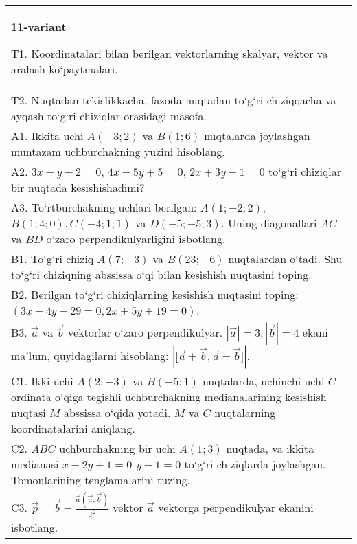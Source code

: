 \documentclass{article}
\begin{document}
\begin{tabular}{m{17cm}}
\textbf{11-variant}
\newline

T1. 
Koordinatalari bilan berilgan vektorlarning skalyar, vektor va aralash ko‘paytmalari. \\
T2. 
Nuqtadan tekislikkacha, fazoda nuqtadan to‘g‘ri chiziqqacha va ayqash to‘g‘ri chiziqlar orasidagi masofa. \\
A1. 
Ikkita uchi $A (-3; 2) $ va $B (1; 6) $ nuqtalarda
joylashgan muntazam uchburchakning yuzini hisoblang.
 \\
A2. 
$3x-y+2=0$, $4x-5y+5=0$, $2x+3y-1=0$
to‘g‘ri chiziqlar bir nuqtada kesishishadimi?
 \\
A3. 
To‘rtburchakning uchlari berilgan:
$A (1; - 2;2) $, $B (1;4;0),C (- 4;1;1) $ va $D (- 5; -5;3) $. Uning diagonallari $AC$ va $BD$ o‘zaro
perpendikulyarligini isbotlang.
 \\
B1. 
To‘g‘ri chiziq \(A (7;-3) \) va \(B (23;-6) \) nuqtalardan o‘tadi.
Shu to‘g‘ri chiziqning abssissa o‘qi bilan kesishish nuqtasini toping.
 \\
B2. Berilgan to‘g‘ri chiziqlarning kesishish nuqtasini toping:
$(3x-4y-29=0, 2x+5y+19=0)$.
 \\
B3. 
$\vec{a}$ va $\vec{b}$ vektorlar o‘zaro perpendikulyar. $|\vec{a}| = 3,|\vec{b}| = 4$ ekani ma’lum, quyidagilarni hisoblang:
$|\lbrack\vec{a} + \vec{b},\vec{a} - \vec{b}\rbrack|$.
 \\
C1. 
Ikki uchi \(A (2; - 3) \) va \(B (-5;1) \) nuqtalarda,
uchinchi uchi $C$ ordinata o‘qiga tegishli uchburchakning
medianalarining kesishish nuqtasi $M$ abssissa o‘qida yotadi.
$M$ va $C$ nuqtalarning koordinatalarini aniqlang.
 \\
C2. 
$ABC$ uchburchakning bir uchi \(A (1;3) \) nuqtada,
va ikkita medianasi \(x - 2y + 1 = 0\,\ y - 1 = 0\) to‘g‘ri chiziqlarda
joylashgan. Tomonlarining tenglamalarini tuzing.
 \\
C3. 
\(\vec{p} = \vec{b} - \frac{\vec{a} (\vec{a},\vec{b}) }{{\vec{a}}^{2}}\) vektor \(\vec{a}\) vektorga perpendikulyar ekanini isbotlang.
 \\

\end{tabular}
\vspace{1cm}
\end{document}

